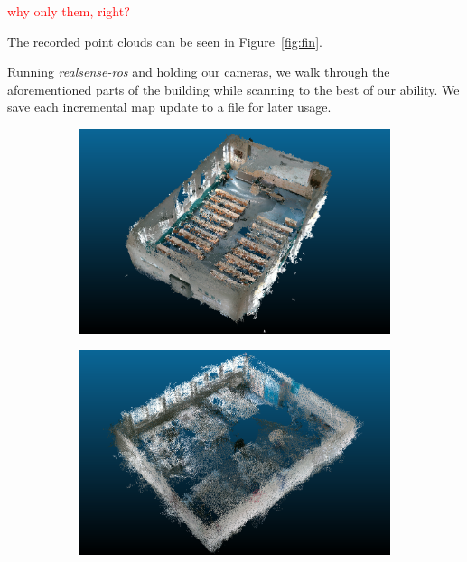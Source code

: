 \documentclass[main.tex]{subfiles}
\begin{document}
\textcolor{red}{why only them, right?}

The recorded point clouds can be seen in Figure~\ref{fig:fin}.


Running \textit{realsense-ros} and holding our cameras, we walk through the aforementioned parts of the building while scanning to the best of our ability.
We save each incremental map update to a file for later usage.

\begin{figure}[H]
    \begin{subfigure}{0.5\textwidth}
        \centering
        \includegraphics[width=.9\linewidth]{images/307.png}
        \caption[Dynamic Dataset - auditorium]{}
        \label{fig:fin307}
    \end{subfigure}
    \begin{subfigure}{0.5\textwidth}
        \centering
        \includegraphics[width=.9\linewidth]{images/333.png}
        \caption[Dynamic Dataset - conference room]{}
        \label{fig:fin333}
    \end{subfigure}
    \begin{subfigure}{0.5\textwidth}

\end{subfigure}
\end{figure}
\end{document}
